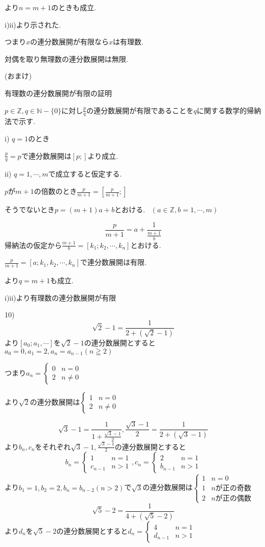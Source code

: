\documentclass{jsarticle}
\begin{document}
より$n=m+1$のときも成立.

i)ii)より示された.

つまり$x$の連分数展開が有限なら$x$は有理数.

対偶を取り無理数の連分数展開は無限.

(おまけ)

有理数の連分数展開が有限の証明

$p\in\mathbb{Z},q\in \mathbb{N}-\{0\}$に対し$\frac{p}{q}$の連分数展開が有限であることを$q$に関する数学的帰納法で示す.

i) $q=1$のとき

$\frac{p}{q}=p$で連分数展開は$[p;]$より成立.

ii) $q=1,\cdots,m$で成立すると仮定する.

$p$が$m+1$の倍数のとき$\frac{p}{m+1}=[\frac{p}{m+1};]$

そうでないとき$p=(m+1)a+b$とおける. \ $(a\in\mathbb{Z} ,b=1,\cdots,m)$

\[\frac{p}{m+1}=a+\frac{1}{\frac{m+1}{b}}\]
帰納法の仮定から$\frac{m+1}{b}=[k_1;k_2,\cdots,k_n]$とおける.

$\frac{p}{m+1}=[a;k_1,k_2,\cdots,k_n]$で連分数展開は有限.

より$q=m+1$も成立.

i)ii)より有理数の連分数展開が有限

10)
\[\sqrt{2}-1 = \frac{1}{2+(\sqrt{2}-1)}\]
より$[a_0;a_1,\cdots ]$を$\sqrt{2}-1$の連分数展開とすると$a_0=0,a_1=2,a_n=a_{n-1}(n\geqq2)$

つまり$a_n=\begin{cases}
0 & n=0\\
2 & n\neq 0
\end{cases}$

より$\sqrt{2}$の連分数展開は$\begin{cases}
1 & n=0\\
2 & n\neq 0
\end{cases}$

\[\sqrt{3}-1=\frac{1}{1+\frac{\sqrt{3}-1}{2}},\frac{\sqrt{3}-1}{2}=\frac{1}{2+(\sqrt{3}-1)}\]
より$b_n,c_n$をそれぞれ$\sqrt{3}-1,\frac{\sqrt{3}-1}{2}$の連分数展開とすると
\[b_n=\begin{cases}
1 & n=1\\
c_{n-1} & n > 1
\end{cases},c_n = \begin{cases}
2 & n=1\\
b_{n-1} & n > 1
\end{cases}\]
より$b_1=1,b_2=2,b_n = b_{n-2} (n>2)$で$\sqrt{3}$の連分数展開は$\begin{cases}
1 & n=0\\
1 & nが正の奇数 \\
2 & nが正の偶数
\end{cases}$
\[\sqrt{5}-2=\frac{1}{4+(\sqrt{5}-2)}\]
より$d_n$を$\sqrt{5}-2$の連分数展開とすると$d_n=\begin{cases}
4 & n=1\\
d_{n-1} & n>1
\end{cases}$
\end{document}
